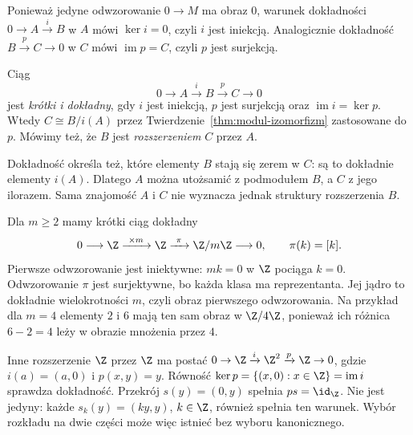 Ponieważ jedyne odwzorowanie $0\to M$ ma obraz $0$,
warunek dokładności $0\to A\xrightarrow{i}B$
w $A$ mówi $\ker i=0$, czyli $i$ jest iniekcją.
Analogicznie dokładność
$B\xrightarrow{p}C\to0$ w $C$ mówi
$\operatorname{im}p=C$, czyli $p$ jest surjekcją.

\begin{definicja}
\label{def:krotki-ciag}
Ciąg
\begin{equation}\label{eq:krotki-ciag}
 0\longrightarrow A\xrightarrow{i}B
   \xrightarrow{p}C\longrightarrow0
\end{equation}
jest \emph{krótki i dokładny}, gdy $i$ jest
iniekcją, $p$ jest surjekcją oraz
$\operatorname{im}i=\ker p$.
Wtedy $C\cong B/i(A)$ przez
Twierdzenie~\ref{thm:modul-izomorfizm}
zastosowane do $p$. Mówimy też,
że $B$ jest \emph{rozszerzeniem} $C$ przez $A$.
\end{definicja}

Dokładność określa też, które elementy $B$ stają się
zerem w $C$: są to dokładnie elementy $i(A)$.
Dlatego $A$ można utożsamić z podmodułem $B$,
a $C$ z jego ilorazem. Sama znajomość $A$ i $C$
nie wyznacza jednak struktury rozszerzenia $B$.

\begin{przyklad}
\label{prz:ses-mod-m}
Dla $m\geq2$ mamy krótki ciąg dokładny
\[
 0\longrightarrow\Z\xrightarrow{\ \times m\ }\Z
   \xrightarrow{\ \pi\ }\Z/m\Z\longrightarrow0,
 \qquad \pi(k)=[k].
\]
Pierwsze odwzorowanie jest iniektywne: $mk=0$
w $\Z$ pociąga $k=0$. Odwzorowanie $\pi$ jest
surjektywne, bo każda klasa ma reprezentanta.
Jej jądro to dokładnie wielokrotności $m$,
czyli obraz pierwszego odwzorowania.
Na przykład dla $m=4$ elementy $2$ i $6$ mają
ten sam obraz w $\Z/4\Z$, ponieważ ich różnica
$6-2=4$ leży w obrazie mnożenia przez $4$.
\end{przyklad}

\begin{przyklad}
\label{prz:ses-z2}
Inne rozszerzenie $\Z$ przez $\Z$ ma postać
$0\to\Z\xrightarrow{i}\Z^2\xrightarrow{p}\Z\to0$,
gdzie $i(a)=(a,0)$ i $p(x,y)=y$.
Równość $\ker p=\{(x,0):x\in\Z\}=\operatorname{im}i$
sprawdza dokładność. Przekrój $s(y)=(0,y)$
spełnia $ps=\id_{\Z}$. Nie jest jedyny:
każde $s_k(y)=(ky,y)$, $k\in\Z$, również
spełnia ten warunek. Wybór rozkładu na dwie
części może więc istnieć bez wyboru kanonicznego.
\end{przyklad}

